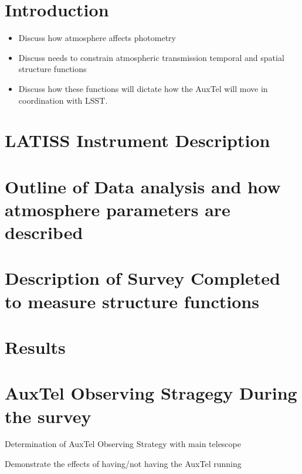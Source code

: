 \section{Introduction}

\begin{itemize}
	\item Discuss how atmosphere affects photometry
	
	\item Discuss needs to constrain atmospheric transmission temporal and spatial structure functions
	
	\item Discuss how these functions will dictate how the AuxTel will move in coordination with LSST.
	
\end{itemize}





 
\section{LATISS Instrument Description} 

\section{Outline of Data analysis and how atmosphere parameters are described} 

\section{Description of Survey Completed to measure structure functions } 

\section{Results}

\section{AuxTel Observing Stragegy During the survey}
Determination of AuxTel Observing Strategy with main telescope

Demonstrate the effects of having/not having the AuxTel running
